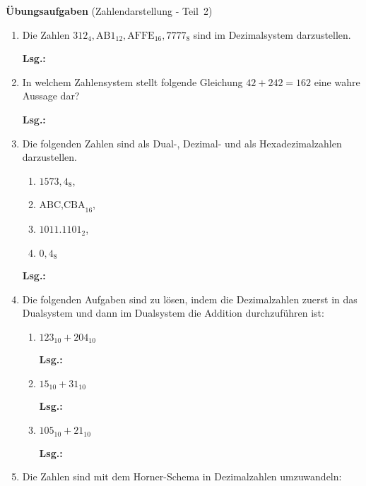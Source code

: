 \documentclass[12pt,a4paper]{scrreprt}
\newcommand{\Lsg}{\par \textbf{Lsg.: }}
\begin{document}
\large{\textbf{Übungsaufgaben} (Zahlendarstellung - Teil~2)}

\begin{enumerate}

\item Die Zahlen $312_4, \text{AB1}_{12}, \text{AFFE}_{16}, 7777_8$ sind im Dezimalsystem darzustellen.

\Lsg%

\item In welchem Zahlensystem stellt folgende Gleichung $42 + 242 = 16 2$ eine wahre Aussage dar?

\Lsg%

\item Die folgenden Zahlen sind als Dual-, Dezimal- und als Hexadezimalzahlen darzustellen.

\begin{enumerate}
\item $1573,4_8$,
\item $\text{ABC,CBA}_{16}$,
\item $1011.1101_2$,
\item $0,4_8$
\end{enumerate}

\Lsg%

\item Die folgenden Aufgaben sind zu lösen, indem die Dezimalzahlen zuerst in das Dualsystem und dann im Dualsystem die Addition durchzuführen ist:

\begin{enumerate}
\item $123_{10} + 204_{10}$

\Lsg%

\item $15_{10} + 31_{10}$

\Lsg%

\item $105_{10} + 21_{10}$

\Lsg%

\end{enumerate}

\item Die Zahlen sind mit dem Horner-Schema in Dezimalzahlen umzuwandeln:


\end{enumerate}
\end{document}
